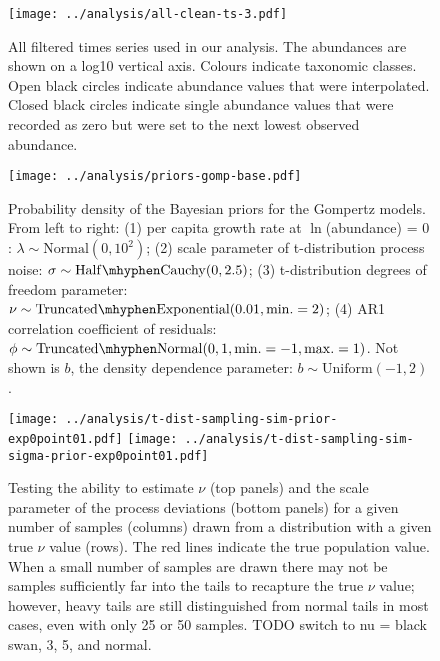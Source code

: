 \clearpage
\renewcommand{\thetable}{S\arabic{table}}
\setcounter{table}{0}

\clearpage


\renewcommand{\thefigure}{S\arabic{figure}}
\setcounter{figure}{0}

\begin{figure}[htbp]
\begin{center}
\texttt{[image: ../analysis/all-clean-ts-3.pdf]}
\caption{
  All filtered times series used in our analysis. The abundances are shown on
  a log10 vertical axis. Colours indicate taxonomic classes. Open black circles
  indicate abundance values that were interpolated. Closed black circles
  indicate single abundance values that were recorded as zero but were set to
  the next lowest observed abundance.
}
    \label{fig:all-ts}
\end{center}
\end{figure}

\clearpage

\begin{figure}[htbp]
\begin{center}
\texttt{[image: ../analysis/priors-gomp-base.pdf]}
\caption{
  Probability density of the Bayesian priors for the Gompertz models. From left
  to right: (1) per capita growth rate at $\ln$(abundance) = $0$: $\lambda \sim
  \mathrm{Normal}(0, 10^2)$; (2) scale parameter of t-distribution process
  noise: $\sigma \sim \mathrm{Half\mhyphen Cauchy} (0,
  2.5)$; (3) t-distribution degrees of freedom parameter: $\nu \sim
  \mathrm{Truncated\mhyphen Exponential}(0.01, \mathrm{min.} = 2)$; (4) AR1
  correlation coefficient of residuals: $\phi \sim \mathrm{Truncated \mhyphen
    Normal}(0, 1, \mathrm{min.} = -1, \mathrm{max.} = 1)$. Not shown is $b$,
  the density dependence parameter: $b \sim \mathrm{Uniform}(-1, 2)$.
}
  \label{fig:priors}
\end{center}
\end{figure}

\clearpage

\begin{figure}[htbp]
\begin{center}
\texttt{[image: ../analysis/t-dist-sampling-sim-prior-exp0point01.pdf]}
\texttt{[image: ../analysis/t-dist-sampling-sim-sigma-prior-exp0point01.pdf]}
\caption{
  Testing the ability to estimate $\nu$ (top panels) and the scale parameter of
  the process deviations (bottom panels) for a given number of samples (columns)
  drawn from a distribution with a given true $\nu$ value (rows). The red lines
  indicate the true population value. When a small number of samples are drawn
  there may not be samples sufficiently far into the tails to recapture the
  true $\nu$ value; however, heavy tails are still distinguished from normal
  tails in most cases, even with only 25 or 50 samples. TODO switch to nu
  = black swan, 3, 5, and normal.
}
\label{fig:sim-nu}
\end{center}
\end{figure}

